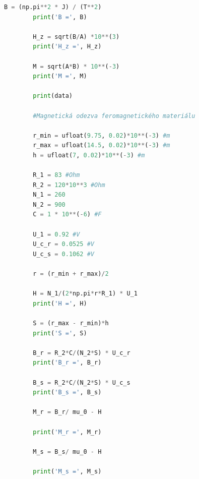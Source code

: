 \documentclass[a4paper,11pt]{article}
\begin{document}
\begin{lstlisting}[language=Python, basicstyle=\tiny, breaklines=true, postbreak=\mbox{\textbackslashspace}]
        B = (np.pi**2 * J) / (T**2)
        print('B =', B)
        
        H_z = sqrt(B/A) *10**(3)
        print('H_z =', H_z)
        
        M = sqrt(A*B) * 10**(-3)
        print('M =', M)
        
        print(data)

        #Magnetická odezva feromagnetického materiálu

        r_min = ufloat(9.75, 0.02)*10**(-3) #m
        r_max = ufloat(14.5, 0.02)*10**(-3) #m
        h = ufloat(7, 0.02)*10**(-3) #m
        
        R_1 = 83 #Ohm
        R_2 = 120*10**3 #Ohm
        N_1 = 260
        N_2 = 900
        C = 1 * 10**(-6) #F
        
        U_1 = 0.92 #V
        U_c_r = 0.0525 #V
        U_c_s = 0.1062 #V
        
        r = (r_min + r_max)/2
        
        H = N_1/(2*np.pi*r*R_1) * U_1
        print('H =', H)
        
        S = (r_max - r_min)*h
        print('S =', S)
        
        B_r = R_2*C/(N_2*S) * U_c_r
        print('B_r =', B_r)
        
        B_s = R_2*C/(N_2*S) * U_c_s
        print('B_s =', B_s)

        M_r = B_r/ mu_0 - H

        print('M_r =', M_r)

        M_s = B_s/ mu_0 - H

        print('M_s =', M_s)
    \end{lstlisting}  
\end{document}
